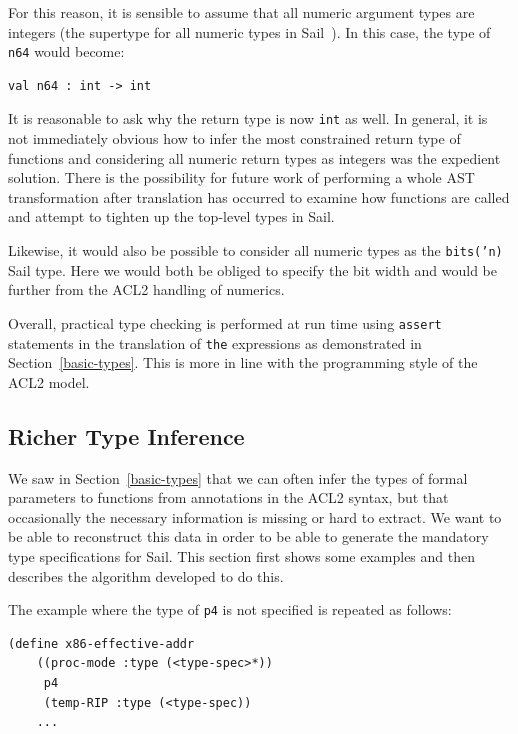 \documentclass[a4paper,12pt,twoside,openright]{report}
\begin{document}
For this reason, it is sensible to assume that all numeric argument types are integers (the supertype for all numeric types in Sail~\cite{sail-manual}).  In this case, the type of \texttt{n64} would become:

\begin{lstlisting}[language=sail]
val n64 : int -> int
\end{lstlisting}

It is reasonable to ask why the return type is now \texttt{int} as well.  In general, it is not immediately obvious how to infer the most constrained return type of functions and considering all numeric return types as integers was the expedient solution.  There is the possibility for future work of performing a whole AST transformation after translation has occurred to examine how functions are called and attempt to tighten up the top-level types in Sail.

Likewise, it would also be possible to consider all numeric types as the \texttt{bits('n)} Sail type.  Here we would both be obliged to specify the bit width and would be further from the ACL2 handling of numerics.

Overall, practical type checking is performed at run time using \texttt{assert} statements in the translation of \texttt{the} expressions as demonstrated in Section~\ref{basic-types}.  This is more in line with the programming style of the ACL2 model.

\hypertarget{type-algo}{
\subsection{Richer Type Inference}\label{type-algo}}

We saw in Section~\ref{basic-types} that we can often infer the types of formal parameters to functions from annotations in the ACL2 syntax, but that occasionally the necessary information is missing or hard to extract.  We want to be able to reconstruct this data in order to be able to generate the mandatory type specifications for Sail.  This section first shows some examples and then describes the algorithm developed to do this.

The example where the type of \texttt{p4} is not specified is repeated as follows:

\begin{minipage}{\linewidth}
\begin{lstlisting}
(define x86-effective-addr
    ((proc-mode :type (<type-spec>*))
     p4
     (temp-RIP :type (<type-spec))
	...
\end{lstlisting}
\end{minipage}
\end{document}
